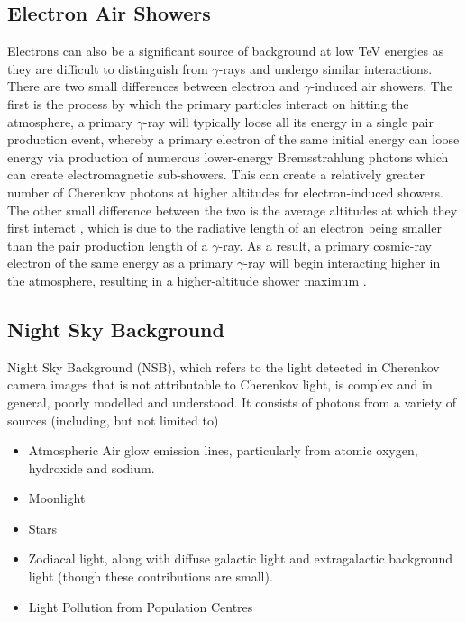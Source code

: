 \subsection{Electron Air Showers}

Electrons can also be a significant source of background at low TeV energies as they are difficult to distinguish from $\gamma$-rays and undergo similar interactions. There are two small differences between electron and $\gamma$-induced air showers. The first is the process by which the primary particles interact on hitting the atmosphere, a primary $\gamma$-ray will typically loose all its energy in a single pair production event, whereby a primary electron of the same initial energy can loose energy via production of numerous lower-energy Bremsstrahlung photons which can create electromagnetic sub-showers. This can create a relatively greater number of Cherenkov photons at higher altitudes for electron-induced showers. The other small difference between the two is the average altitudes at which they first interact \cite{Sitarek1i}, which is due to the radiative length of an electron being smaller than the pair production length of a $\gamma$-ray. As a result, a primary cosmic-ray electron of the same energy as a primary $\gamma$-ray will begin interacting higher in the atmosphere, resulting in a higher-altitude shower maximum \cite{lypova}. 

\subsection{Night Sky Background}
Night Sky Background (NSB), which refers to the light detected in Cherenkov camera images that is not attributable to Cherenkov light, is complex and in general, poorly modelled and understood. It consists of photons from a variety of sources (including, but not limited to)

\begin{itemize}
    \item Atmospheric Air glow emission lines, particularly from atomic oxygen, hydroxide and sodium.
    \item Moonlight
    \item Stars
    \item Zodiacal light, along with diffuse galactic light and extragalactic background light (though these contributions are small). \cite{nsbref}
    \item Light Pollution from Population Centres
\end{itemize}

